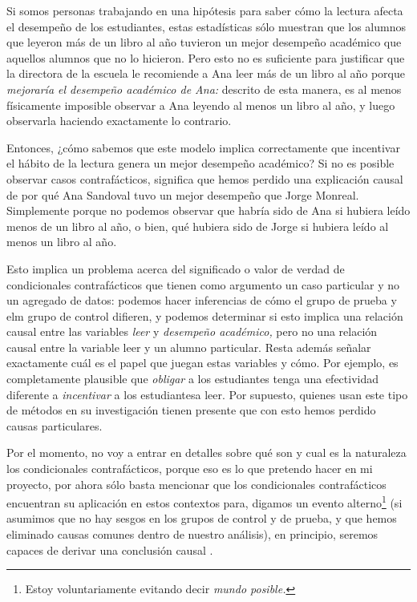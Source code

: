 Si somos personas trabajando en una hipótesis para saber
cómo la lectura afecta el desempeño de los estudiantes,
estas estadísticas sólo muestran que los alumnos que leyeron
más de un libro al año tuvieron un mejor desempeño académico
que aquellos alumnos que no lo hicieron. Pero esto no es
suficiente para justificar que la directora de la escuela le
recomiende a Ana leer más de un libro al año porque
\emph{mejoraría el desempeño académico de Ana:} descrito de
esta manera, es al menos físicamente imposible observar a
Ana leyendo al menos un libro al año, y luego observarla
haciendo exactamente lo contrario.

Entonces, ¿cómo sabemos que este modelo implica
correctamente que incentivar el hábito de la lectura genera
un mejor desempeño académico? Si no es posible observar
casos contrafácticos, significa que hemos perdido una
explicación causal de por qué Ana Sandoval tuvo un mejor
desempeño que Jorge Monreal. Simplemente porque no podemos
observar que habría sido de Ana si hubiera leído menos de un
libro al año, o bien, qué hubiera sido de Jorge si hubiera
leído al menos un libro al año.

Esto implica un problema acerca del significado o valor de
verdad de condicionales contrafácticos que tienen como
argumento un caso particular y no un agregado de datos:
podemos hacer inferencias de cómo el grupo de prueba y elm
grupo de control difieren, y podemos determinar si esto
implica una relación causal entre las variables \emph{leer}
y \emph{desempeño académico,} pero no una relación causal
entre la variable leer y un alumno particular. Resta además
señalar exactamente cuál es el papel que juegan estas
variables y cómo. Por ejemplo, es completamente plausible
que \emph{obligar} a los estudiantes tenga una efectividad
diferente a \emph{incentivar} a los estudiantesa leer. Por
supuesto, quienes usan este tipo de métodos en su
investigación tienen presente que con esto hemos perdido
causas particulares.

Por el momento, no voy a entrar en detalles sobre qué son y
cual es la naturaleza los condicionales contrafácticos,
porque eso es lo que pretendo hacer en mi proyecto, por
ahora sólo basta mencionar que los condicionales
contrafácticos encuentran su aplicación en estos contextos
para, digamos  un evento alterno\footnote{
	Estoy voluntariamente evitando decir \emph{mundo posible.}
} 
(si asumimos que no hay sesgos en los grupos de control y
de prueba, y que hemos eliminado causas comunes dentro de
nuestro análisis), en principio, seremos capaces de derivar
una conclusión causal \cite{Otsuka2023}.


